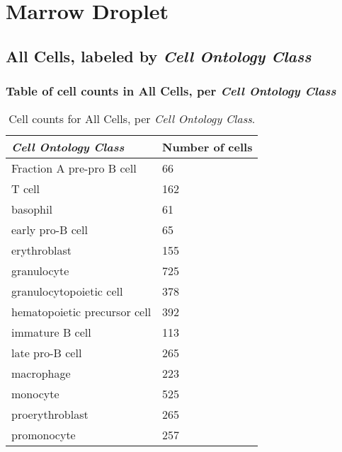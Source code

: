 \clearpage
\section{Marrow Droplet}

\subsection{All Cells, labeled by \emph{Cell Ontology Class}}
\subsubsection{Table of cell counts in All Cells, per \emph{Cell Ontology Class}}\begin{table}[h]
\centering
\label{my-label}
\begin{tabular}{@{}ll@{}}
\toprule

\emph{Cell Ontology Class}& Number of cells \\ \midrule
Fraction A pre-pro B cell & 66 \\

T cell & 162 \\

basophil & 61 \\

early pro-B cell & 65 \\

erythroblast & 155 \\

granulocyte & 725 \\

granulocytopoietic cell & 378 \\

hematopoietic precursor cell & 392 \\

immature B cell & 113 \\

late pro-B cell & 265 \\

macrophage & 223 \\

monocyte & 525 \\

proerythroblast & 265 \\

promonocyte & 257 \\
\bottomrule
\end{tabular}
\caption{Cell counts for All Cells, per \emph{Cell Ontology Class}.}
\end{table}


